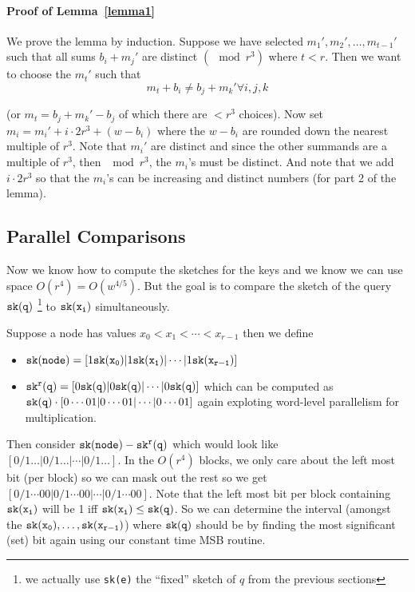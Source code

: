 \documentclass[11pt]{article}
\newcommand{\sk}[1]{{\tt{sk}(#1)}}
\newcommand{\skr}[1]{{\tt{sk}^r(#1)}}
\begin{document}
\paragraph{Proof of Lemma~\ref{lemma1}}

We prove the lemma by induction. Suppose we
have selected $m_1', m_2', \ldots, m_{t-1}'$ such that all sums
$b_i + m_j'$ are distinct $(\mod r^3)$ where $t < r$. Then we
want to choose the $m_t'$ such that
$$
m_t + b_i \neq b_j + m_k'\forall i,j,k
$$

(or $m_t = b_j + m_k' - b_j$ of
which there are $< r^3$ choices). Now set
$m_i = m_i' + i\cdot 2r^3 + (w-b_i)$ where the $w-b_i$ are
rounded down the nearest multiple of $r^3$. Note that $m_i'$
are distinct and since the other summands are a multiple
of $r^3$, then $\mod r^3$, the $m_i$'s must be distinct. And note
that we add $i\cdot 2r^3$ so that the $m_i$'s can be
increasing and distinct numbers (for part 2 of the lemma).

\subsection{Parallel Comparisons}

Now we know how to compute the sketches for the keys and
we know we can use space $O(r^4) = O(w^{4/5})$. But the
goal is to compare the sketch of the
query $\sk{q}$
\footnote{we actually use \sk{e} the ``fixed'' sketch
of $q$ from the previous sections}
to $\sk{x_i}$ simultaneously.

Suppose a node has values
$x_0 < x_1 < \cdots < x_{r-1}$ then we define
\begin{itemize}
\item
  $\sk{node} = [1\sk{x_0}|1\sk{x_1}|\cdots|1\sk{x_{r-1}}]$
\item
  $\skr{q} = [0\sk{q}|0\sk{q}|\cdots|0\sk{q}]$ which
  can be computed as\\
  $\sk{q}\cdot [0\cdots 01|0\cdots 01|\cdots|0\cdots 01]$ again
  exploting word-level parallelism for multiplication.
\end{itemize}

Then consider $\sk{node} - \skr{q}$ which would look like \\
$[0/1\ldots|0/1\ldots|\cdots|0/1\ldots]$. In the $O(r^4)$ blocks,
we only care about the left most bit (per block)
so we can mask out the rest so we get
$[0/1\cdots 00|0/1\cdots 00|\cdots|0/1\cdots 00]$. Note that
the left most bit per block containing $\sk{x_i}$
will be 1 iff
$\sk{x_i} \leq \sk{q}$. So we can determine the interval
(amongst the $\sk{x_0}, \ldots, \sk{x_{r-1}}$) where
$\sk{q}$ should
be by finding the most significant (set) bit again using our
constant time MSB routine.
\end{document}

